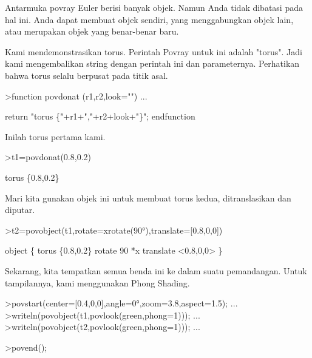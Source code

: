 \documentclass[12pt,arial,letterpaper]{book}
\begin{document}
\begin{eulercomment}
\begin{eulercomment}
\begin{eulercomment}
\begin{eulercomment}
\begin{eulercomment}
\begin{eulercomment}
\begin{eulercomment}
\begin{eulercomment}
\begin{eulercomment}
\begin{eulercomment}
\begin{eulercomment}
\begin{eulercomment}
\begin{eulercomment}
\begin{eulercomment}
\begin{eulercomment}
\begin{eulercomment}
\begin{eulercomment}
\begin{eulercomment}
\begin{eulercomment}
Antarmuka povray Euler berisi banyak objek. Namun Anda tidak dibatasi
pada hal ini. Anda dapat membuat objek sendiri, yang menggabungkan
objek lain, atau merupakan objek yang benar-benar baru.

Kami mendemonstrasikan torus. Perintah Povray untuk ini adalah
"torus". Jadi kami mengembalikan string dengan perintah ini dan
parameternya. Perhatikan bahwa torus selalu berpusat pada titik asal.
\end{eulercomment}
\begin{eulerprompt}
>function povdonat (r1,r2,look="") ...
\end{eulerprompt}
\begin{eulerudf}
    return "torus \{"+r1+","+r2+look+"\}";
  endfunction
\end{eulerudf}
\begin{eulercomment}
Inilah torus pertama kami.
\end{eulercomment}
\begin{eulerprompt}
>t1=povdonat(0.8,0.2)
\end{eulerprompt}
\begin{euleroutput}
  torus \{0.8,0.2\}
\end{euleroutput}
\begin{eulercomment}
Mari kita gunakan objek ini untuk membuat torus kedua, ditranslasikan
dan diputar.
\end{eulercomment}
\begin{eulerprompt}
>t2=povobject(t1,rotate=xrotate(90°),translate=[0.8,0,0])
\end{eulerprompt}
\begin{euleroutput}
  object \{ torus \{0.8,0.2\}
   rotate 90 *x 
   translate <0.8,0,0>
   \}
\end{euleroutput}
\begin{eulercomment}
Sekarang, kita tempatkan semua benda ini ke dalam suatu pemandangan.
Untuk tampilannya, kami menggunakan Phong Shading.
\end{eulercomment}
\begin{eulerprompt}
>povstart(center=[0.4,0,0],angle=0°,zoom=3.8,aspect=1.5); ...
>writeln(povobject(t1,povlook(green,phong=1))); ...
>writeln(povobject(t2,povlook(green,phong=1))); ...
\end{eulerprompt}
\begin{eulerttcomment}
 >povend();
\end{eulerttcomment}
\begin{eulercomment}

\end{eulercomment}
\end{eulercomment}
\end{eulercomment}
\end{eulercomment}
\end{eulercomment}
\end{eulercomment}
\end{eulercomment}
\end{eulercomment}
\end{eulercomment}
\end{eulercomment}
\end{eulercomment}
\end{eulercomment}
\end{eulercomment}
\end{eulercomment}
\end{eulercomment}
\end{eulercomment}
\end{eulercomment}
\end{eulercomment}
\end{eulercomment}
\end{document}
